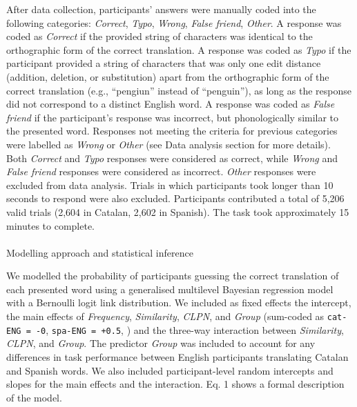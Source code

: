 \documentclass[
]{article}
\makeatletter
\let\oldparagraph\paragraph
\renewcommand{\paragraph}{
    \@ifstar
      \xxxParagraphStar
      \xxxParagraphNoStar
  }
\newcommand{\xxxParagraphStar}[1]{\oldparagraph*{#1}\mbox{}}
\newcommand{\xxxParagraphNoStar}[1]{\oldparagraph{#1}\mbox{}}
\makeatother
\begin{document}
After data collection, participants' answers were manually coded into
the following categories: \emph{Correct}, \emph{Typo}, \emph{Wrong},
\emph{False friend}, \emph{Other}. A response was coded as
\emph{Correct} if the provided string of characters was identical to the
orthographic form of the correct translation. A response was coded as
\emph{Typo} if the participant provided a string of characters that was
only one edit distance (addition, deletion, or substitution) apart from
the orthographic form of the correct translation (e.g., ``pengiun''
instead of ``penguin''), as long as the response did not correspond to a
distinct English word. A response was coded as \emph{False friend} if
the participant's response was incorrect, but phonologically similar to
the presented word. Responses not meeting the criteria for previous
categories were labelled as \emph{Wrong} or \emph{Other} (see Data
analysis section for more details). Both \emph{Correct} and \emph{Typo}
responses were considered as correct, while \emph{Wrong} and \emph{False
friend} responses were considered as incorrect. \emph{Other} responses
were excluded from data analysis. Trials in which participants took
longer than 10 seconds to respond were also excluded. Participants
contributed a total of 5,206 valid trials (2,604 in Catalan, 2,602 in
Spanish). The task took approximately 15 minutes to complete.

\paragraph{Modelling approach and statistical
inference}\label{modelling-approach-and-statistical-inference}

We modelled the probability of participants guessing the correct
translation of each presented word using a generalised multilevel
Bayesian regression model with a Bernoulli logit link distribution. We
included as fixed effects the intercept, the main effects of
\emph{Frequency}, \emph{Similarity}, \emph{CLPN}, and \emph{Group}
(sum-coded as \texttt{cat-ENG\ =\ -0}, \texttt{spa-ENG\ =\ +0.5},
) and the
three-way interaction between \emph{Similarity}, \emph{CLPN}, and
\emph{Group}. The predictor \emph{Group} was included to account for any
differences in task performance between English participants translating
Catalan and Spanish words. We also included participant-level random
intercepts and slopes for the main effects and the interaction. Eq. 1
shows a formal description of the model.
\end{document}
